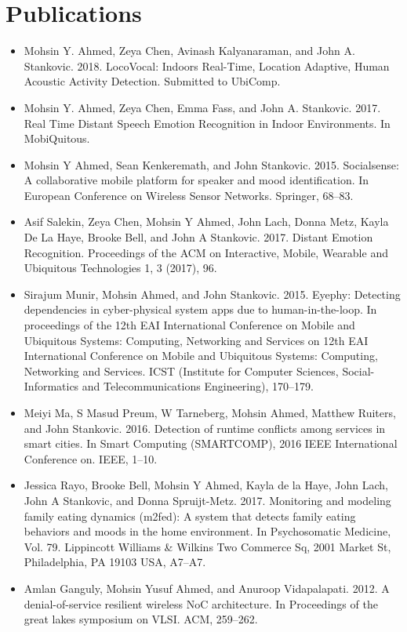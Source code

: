 \documentclass[letterpaper,11pt]{article}
\begin{document}
\section{Publications}
\begin{itemize}[leftmargin=*]
    \item Mohsin Y. Ahmed, Zeya Chen, Avinash Kalyanaraman, and John A. Stankovic. 2018.  LocoVocal: Indoors Real-Time, Location Adaptive, Human Acoustic Activity Detection. Submitted to UbiComp.
    \item Mohsin Y. Ahmed, Zeya Chen, Emma Fass, and John A. Stankovic. 2017.  Real Time Distant Speech Emotion Recognition in Indoor Environments. In MobiQuitous.
    \item Mohsin Y Ahmed, Sean Kenkeremath, and John Stankovic. 2015. Socialsense: A collaborative mobile platform for speaker and mood identification. In European Conference on Wireless Sensor Networks. Springer, 68–83.
    \item Asif Salekin, Zeya Chen, Mohsin Y Ahmed, John Lach, Donna Metz, Kayla De La Haye, Brooke Bell, and John A Stankovic. 2017. Distant Emotion Recognition. Proceedings of the ACM on Interactive, Mobile, Wearable and Ubiquitous Technologies 1, 3 (2017), 96.
    \item Sirajum Munir, Mohsin Ahmed, and John Stankovic. 2015.  Eyephy: Detecting dependencies in cyber-physical system apps due to human-in-the-loop. In proceedings of the 12th EAI International Conference on Mobile and Ubiquitous Systems: Computing, Networking and Services on 12th EAI International Conference on Mobile and Ubiquitous Systems: Computing, Networking and Services. ICST (Institute for Computer Sciences, Social-Informatics and Telecommunications Engineering), 170–179.
    \item Meiyi Ma, S Masud Preum, W Tarneberg, Mohsin Ahmed, Matthew Ruiters, and John Stankovic. 2016. Detection of runtime conflicts among services in smart cities. In Smart Computing (SMARTCOMP), 2016 IEEE International Conference on. IEEE, 1–10.
    \item Jessica Rayo, Brooke Bell, Mohsin Y Ahmed, Kayla de la Haye, John Lach, John A Stankovic, and Donna Spruijt-Metz. 2017. Monitoring and modeling family eating dynamics (m2fed): A system that detects family eating behaviors and moods in the home environment. In Psychosomatic Medicine, Vol. 79. Lippincott Williams \& Wilkins Two Commerce Sq, 2001 Market St, Philadelphia, PA 19103 USA, A7–A7.
    \item Amlan Ganguly, Mohsin Yusuf Ahmed, and Anuroop Vidapalapati. 2012. A denial-of-service resilient wireless NoC architecture. In Proceedings of the great lakes symposium on VLSI. ACM, 259–262.
    
\end{itemize}
\end{document}

